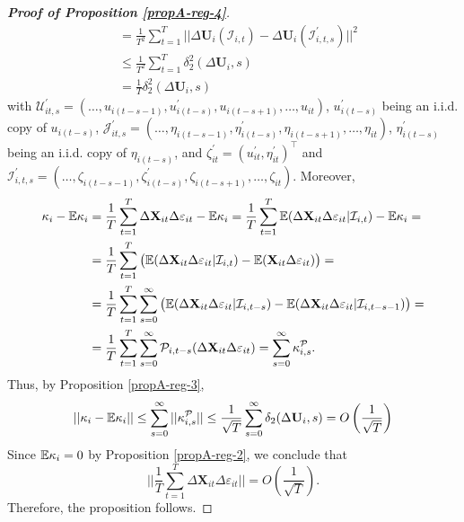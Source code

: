 \documentclass[a4paper,12pt]{article}
\begin{document}
\begin{proof}[\textnormal{\textbf{Proof of Proposition \ref{propA-reg-4}}}]
\begin{align*}
& = \frac{1}{T^2} \sum_{t=1}^T \Big|\Big| \Delta \mathbf{U}_i(\mathcal{I}_{i,t})  - \Delta \mathbf{U}_i(\mathcal{I}_{i,t, s}^\prime) \Big|\Big|^2 \\
& \leq \frac{1}{T^2} \sum_{t=1}^T \delta_2^2(\Delta \mathbf{U}_i, s)\\
& = \frac{1}{T}\delta_2^2(\Delta \mathbf{U}_i, s)
\end{align*}
with $\mathcal{U}_{it, s}^\prime = (\ldots, u_{i(t-s-1)}, u^\prime_{i(t-s)}, u_{i(t-s+1)}, \ldots, u_{it})$, $u_{i(t-s)}^\prime$ being an i.i.d. copy of $u_{i(t-s)}$, $\mathcal{J}_{it, s}^\prime = (\ldots, \eta_{i(t-s-1)}, \eta^\prime_{i(t-s)}, \eta_{i(t-s+1)}, \ldots, \eta_{it})$, $\eta_{i(t-s)}^\prime$ being an i.i.d. copy of $\eta_{i(t-s)}$, and $\zeta^\prime_{it} = (u_{it}^\prime, \eta_{it}^\prime)^\top$ and $\mathcal{I}_{i,t,s}^\prime =(\ldots, \zeta_{i(t-s-1)}, \zeta^\prime_{i(t-s)}, \zeta_{i(t-s+1)}, \ldots, \zeta_{it})$.
Moreover,
\begin{align*}
\kappa_i - \mathbb{E} \kappa_i &= \frac{1}{T}\sum_{t=1}^T \Delta \mathbf{X}_{it}\Delta \varepsilon_{it} - \mathbb{E} \kappa_i = \frac{1}{T}\sum_{t=1}^T \mathbb{E} ( \Delta \mathbf{X}_{it}\Delta \varepsilon_{it}|\mathcal{I}_{i,t}) - \mathbb{E} \kappa_i =\\
&= \frac{1}{T}\sum_{t=1}^T \big( \mathbb{E} ( \Delta \mathbf{X}_{it}\Delta \varepsilon_{it}|\mathcal{I}_{i,t} ) - \mathbb{E} ( \mathbf{X}_{it}\Delta \varepsilon_{it}) \big) = \\
&= \frac{1}{T}\sum_{t=1}^T \sum_{s=0}^\infty \big( \mathbb{E} ( \Delta \mathbf{X}_{it}\Delta \varepsilon_{it}|\mathcal{I}_{i,t-s} ) - \mathbb{E} ( \Delta \mathbf{X}_{it}\Delta \varepsilon_{it}|\mathcal{I}_{i,t-s-1} )  \big) =\\
&= \frac{1}{T}\sum_{t=1}^T \sum_{s=0}^\infty \mathcal{P}_{i, t-s} (\Delta \mathbf{X}_{it}\Delta \varepsilon_{it}) = \sum_{s=0}^\infty \kappa_{i, s}^{\mathcal{P}}.
\end{align*}
Thus, by Proposition \ref{propA-reg-3},
\[ || \kappa_i - \mathbb{E} \kappa_i || \leq \sum_{s=0}^\infty ||\kappa_{i, s}^{\mathcal{P}} || \leq \frac{1}{\sqrt{T}}\sum_{s=0}^\infty \delta_2(\Delta \mathbf{U}_i, s) = O\left(\frac{1}{\sqrt{T}}\right)
\]
Since $\mathbb{E} \kappa_i = 0$ by Proposition \ref{propA-reg-2}, we conclude that
\[  \Big|\Big| \frac{1}{T}\sum_{t=1}^T  \Delta \mathbf{X}_{it}\Delta \varepsilon_{it} \Big|\Big| = O\left(\frac{1}{\sqrt{T}}\right).
\]
Therefore, the proposition follows.
\end{proof}
\end{document}
